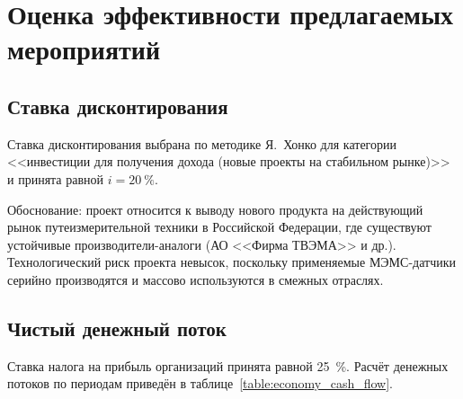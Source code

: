 
\section{Оценка эффективности предлагаемых мероприятий}
\label{sec:economy_efficiency}

\subsection{Ставка дисконтирования}
\label{subsec:discount_rate}

Ставка дисконтирования выбрана по методике Я.~Хонко для категории <<инвестиции для получения дохода (новые проекты на стабильном рынке)>> и принята равной $i = 20~\%$.

Обоснование: проект относится к выводу нового продукта на действующий рынок путеизмерительной техники в Российской Федерации, где существуют устойчивые производители-аналоги (АО <<Фирма ТВЭМА>> и др.). Технологический риск проекта невысок, поскольку применяемые МЭМС-датчики серийно производятся и массово используются в смежных отраслях.

\subsection{Чистый денежный поток}
\label{subsec:cash_flow}

Ставка налога на прибыль организаций принята равной 25~\%. Расчёт денежных потоков по периодам приведён в таблице~\ref{table:economy_cash_flow}.

